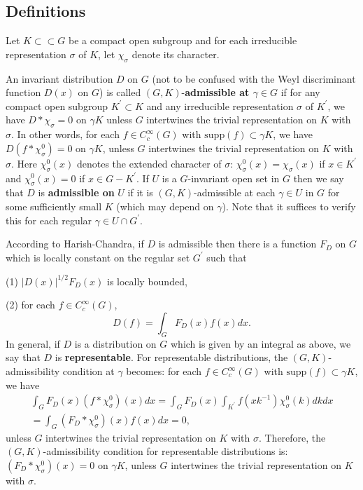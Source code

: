 \documentclass[11pt, a4paper]{article}
\begin{document}
\subsection{Definitions}

Let $K\subset \subset G$ be a compact open subgroup and for each irreducible
representation $\sigma $ of $K$, let $\chi _\sigma $ denote its character.

An invariant distribution $D$ on $G$ (not to be confused with the Weyl
discriminant function $D(x)$ on $G$) is called $(G,K)$-{\bf admissible at $%
\gamma \in G$} if for any compact open subgroup $K^{\prime }\subset K$ and
any irreducible representation $\sigma $ of $K^{\prime }$, we have $D*\chi
_\sigma =0$ on $\gamma K$ unless $G$ intertwines the trivial representation
on $K$ with $\sigma $. In other words, for each $f\in C_c^\infty (G)$ with $%
\mathrm{supp}(f)\subset \gamma K$, we have $D(f*\chi _\sigma ^0)=0$ on $\gamma K$,
unless $G$ intertwines the trivial representation on $K$ with $\sigma $.
Here $\chi _\sigma ^0(x)$ denotes the extended character of $\sigma $: $\chi
_\sigma ^0(x)=\chi _\sigma (x)$ if $x\in K^{\prime }$ and $\chi _\sigma
^0(x)=0$ if $x\in G-K^{\prime }$. If $U$ is a $G$-invariant open set in $G$
then we say that $D$ is {\bf admissible on }$U$ if it is $(G,K)$-admissible
at each $\gamma \in U$ in $G$ for some sufficiently small $K$ (which may
depend on $\gamma $). Note that it suffices to verify this for each regular $%
\gamma \in U\cap G^{\prime }$.

According to Harish-Chandra, if $D$ is admissible then there is a function $%
F_D$ on $G$ which is locally constant on the regular set $G^{\prime }$ such
that

(1) $|D(x)|^{1/2}F_D(x)$ is locally bounded,

(2) for each $f\in C_c^\infty (G)$,
\[
D(f)=\int_GF_D(x)f(x)dx.
\]
In general, if $D$ is a distribution on $G$ which is given by an integral as
above, we say that $D$ is {\bf representable}. For representable
distributions, the $(G,K)$-admissibility condition at $\gamma $ becomes: for
each $f\in C_c^\infty (G)$ with $\mathrm{supp}(f)\subset \gamma K$, we have
\[
\begin{array}{c}
\int_GF_D(x)(f*\chi _\sigma ^0)(x)dx=\int_GF_D(x)\int_{K^{\prime
}}f(xk^{-1})\chi _\sigma ^0(k)dkdx \\ 
=\int_G(F_D*\chi _\sigma ^0)(x)f(x)dx=0,
\end{array}
\]
unless $G$ intertwines the trivial representation on $K$ with $\sigma $.
Therefore, the $(G,K)$-admissibility condition for representable distributions
is: $(F_D*\chi _\sigma ^0)(x)=0$ on $\gamma K$, unless $G$ intertwines the
trivial representation on $K$ with $\sigma $.
\end{document}
